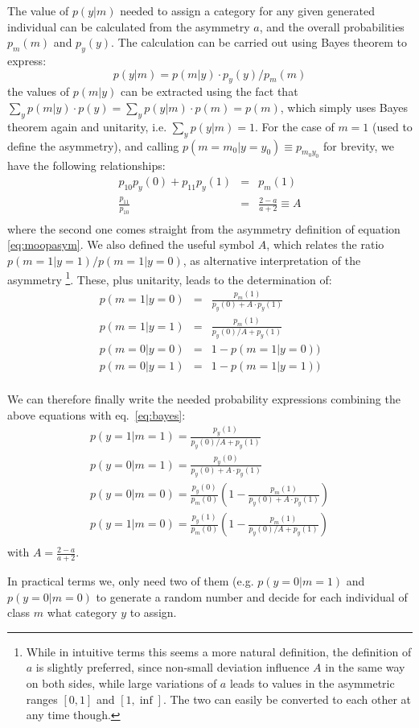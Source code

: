 \documentclass{article}
\begin{document}
The value of $p(y | m)$ needed to assign a category for any given generated individual can be calculated from the asymmetry $a$, and the overall
probabilities $p_m(m)$ and $p_y(y)$. 
The calculation can be carried out using Bayes theorem to express:
\begin{equation}
\label{eq:bayes}
p(y | m) = p(m | y)\cdot p_y(y) / p_m(m)
\end{equation}
the values of $p(m | y)$ can be extracted using the fact that $\sum_y p(m | y)\cdot p(y) = \sum_y p(y | m)\cdot p(m) = p(m)$, which simply
uses Bayes theorem again and unitarity, i.e. $\sum_y p(y | m) = 1$.
For the case of $m=1$ (used to define the asymmetry), and calling $p(m=m_0 | y=y_0)\equiv p_{m_0y_0}$ for brevity, we have the 
following relationships:
\begin{eqnarray}
p_{10}p_y(0) + p_{11}p_y(1) & = & p_m(1) \\
\frac{p_{11}}{p_{10}} & = & \frac{2-a}{a+2} \equiv A \\
\end{eqnarray}
where the second one comes straight from the asymmetry definition of equation \ref{eq:moopasym}.
We also defined the useful symbol $A$, which relates the ratio $p(m=1|y=1) / p(m=1|y=0)$, as alternative interpretation of the asymmetry
\footnote{While in intuitive terms this seems a more natural definition, the definition of $a$ is slightly preferred, since non-small deviation influence $A$ in the same way on both sides, while large variations of $a$ leads to values in the asymmetric ranges $[0,1]$ and $[1,\inf]$. The two can easily be converted to each other at any time though.}.
These, plus unitarity, leads to the determination of:
\begin{eqnarray}
p(m=1 | y=0) &=& \frac{p_m(1)}{p_y(0) + A\cdot p_y(1)} \\
p(m=1 | y=1) &=& \frac{p_m(1)}{p_y(0)/A + p_y(1)} \\
p(m=0 | y=0) &=& 1-p(m=1 | y=0)) \\
p(m=0 | y=1) &=& 1-p(m=1 | y=1)) \\
\end{eqnarray}

We can therefore finally write the needed probability expressions combining the above equations with eq.~\ref{eq:bayes}:
\begin{eqnarray}
p(y=1 | m=1) = \frac{p_y(1)}{p_y(0)/A + p_y(1)} \\
p(y=0 | m=1) = \frac{p_y(0)}{p_y(0) + A\cdot p_y(1)} \\
p(y=0 | m=0) = \frac{p_y(0)}{p_m(0)}\left(1- \frac{p_m(1)}{p_y(0)+A\cdot p_y(1)}\right) \\
p(y=1 | m=0) = \frac{p_y(1)}{p_m(0)}\left(1- \frac{p_m(1)}{p_y(0)/A+p_y(1)}\right) \\
\end{eqnarray}
\noindent
with $A = \frac{2-a}{a+2}$.

In practical terms we, only need two of them (e.g. $p(y=0 | m=1)$ and $p(y=0 | m=0)$ to generate a random number and decide for each individual of class $m$ what category $y$ to assign.
\end{document}
